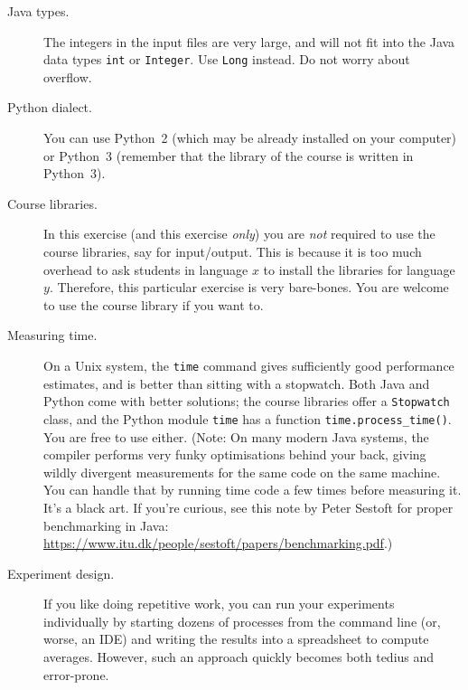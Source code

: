 \documentclass{tufte-handout}
\begin{document}
\begin{description}
  \item[Java types.] The integers in the input files are very large, and will not fit into the Java data types \texttt{int} or \texttt{Integer}.
    Use \texttt{Long} instead.
    Do not worry about overflow.
  \item[Python dialect.] You can use Python~2 (which may be already installed on your computer) or Python~3 (remember that the library of the course is written in Python~3).
  \item[Course libraries.]
    In this exercise (and this exercise \emph{only}) you are \emph{not} required to use the course libraries, say for input/output.
    This is because it is too much overhead to ask students in language $x$ to install the libraries for language $y$.
    Therefore, this particular exercise is very bare-bones.
    You are welcome to use the course library if you want to.
  \item[Measuring time.]
    On a Unix system, the \texttt{time} command gives sufficiently good performance estimates, and is better than sitting with a stopwatch.
    Both Java and Python come with better solutions; the course libraries offer a \texttt{Stopwatch} class, and the Python module \texttt{time} has a function \texttt{time.process\_time()}. You are free to use either. 
    (Note: On many modern Java systems, the compiler performs very funky
    optimisations behind your back, giving wildly divergent measurements for
    the same code on the same machine.  You can handle that by running time
    code a few times before measuring it.  It's a black art.  If you're
    curious, see this note by Peter Sestoft for proper benchmarking in Java:
    \url{https://www.itu.dk/people/sestoft/papers/benchmarking.pdf}.)
  \item[Experiment design.]
    If you like doing repetitive work, you  can run your experiments individually by starting dozens of processes from the command line (or, worse, an IDE) and writing the results into a spreadsheet to compute averages.
    However, such an approach quickly becomes both tedius and error-prone.


\end{description}
\end{document}
